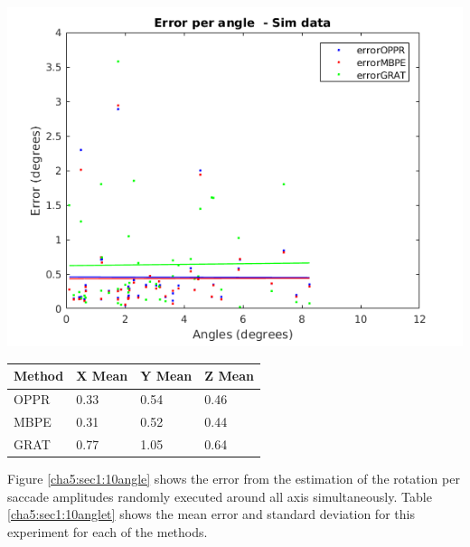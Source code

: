 \begin{minipage}{0.33\textwidth}
	\centering
	\includegraphics[width=\textwidth]{images/sim/10anglez.png}
	\label{cha5:sec1:10anglez}
\end{minipage}
\begin{table}
	\centering
	\begin{tabular}{| l | l | l | l |}
		\hline
		Method & X Mean & Y Mean & Z Mean \\
		\hline
		OPPR &  0.33 \degree & 0.54 \degree & 0.46 \degree \\
		\hline
		MBPE &  0.31 \degree & 0.52 \degree & 0.44 \degree\\
		\hline
		GRAT &  0.77 \degree & 1.05 \degree & 0.64 \degree\\ 
		\hline
	\end{tabular}
	\label{cha5:sec1:10angleaxist}
\end{table}		

Figure \ref{cha5:sec1:10angle} shows the error from the estimation of the rotation per saccade amplitudes randomly executed around all axis simultaneously. Table \ref{cha5:sec1:10anglet} shows the mean error and standard deviation for this experiment for each of the methods.

